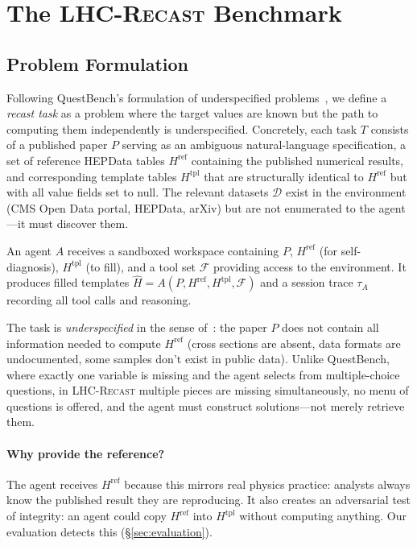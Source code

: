 \documentclass{article}
\newcommand{\toolkit}{\textsc{LHC-Recast}}
\begin{document}
\section{The \toolkit{} Benchmark}
\label{sec:benchmark}

\subsection{Problem Formulation}

Following QuestBench's formulation of underspecified problems~\citep{li2025questbench}, we define a \emph{recast task} as a problem where the target values are known but the path to computing them independently is underspecified.
Concretely, each task $T$ consists of a published paper $P$ serving as an ambiguous natural-language specification, a set of reference HEPData tables $H^{\mathrm{ref}}$ containing the published numerical results, and corresponding template tables $H^{\mathrm{tpl}}$ that are structurally identical to $H^{\mathrm{ref}}$ but with all value fields set to null.
The relevant datasets $\mathcal{D}$ exist in the environment (CMS Open Data portal, HEPData, arXiv) but are not enumerated to the agent---it must discover them.

An agent $A$ receives a sandboxed workspace containing $P$, $H^{\mathrm{ref}}$ (for self-diagnosis), $H^{\mathrm{tpl}}$ (to fill), and a tool set $\mathcal{F}$ providing access to the environment.
It produces filled templates $\hat{H} = A(P, H^{\mathrm{ref}}, H^{\mathrm{tpl}}, \mathcal{F})$ and a session trace $\tau_A$ recording all tool calls and reasoning.

The task is \emph{underspecified} in the sense of~\citet{li2025questbench}: the paper $P$ does not contain all information needed to compute $H^{\mathrm{ref}}$ (cross sections are absent, data formats are undocumented, some samples don't exist in public data).
Unlike QuestBench, where exactly one variable is missing and the agent selects from multiple-choice questions, in \toolkit{} multiple pieces are missing simultaneously, no menu of questions is offered, and the agent must construct solutions---not merely retrieve them.

\paragraph{Why provide the reference?}
The agent receives $H^{\mathrm{ref}}$ because this mirrors real physics practice: analysts always know the published result they are reproducing.
It also creates an adversarial test of integrity: an agent could copy $H^{\mathrm{ref}}$ into $H^{\mathrm{tpl}}$ without computing anything.
Our evaluation detects this (\S\ref{sec:evaluation}).
\end{document}
